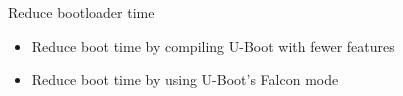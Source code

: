 \setuplabframe
{Reduce bootloader time}
{
\begin{itemize}
\item Reduce boot time by compiling U-Boot with fewer features
\item Reduce boot time by using U-Boot's Falcon mode
\end{itemize}
}

